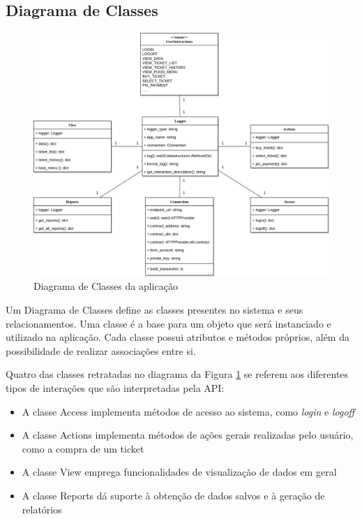 \subsection{Diagrama de Classes}
\begin{figure}
    \centering
    \includegraphics[width=1\textwidth]{img/Cap3/diagramas/Diagrama de Classes.png}
    \caption{Diagrama de Classes da aplicação}
    \label{fig:diagrama_classes}
\end{figure}

Um Diagrama de Classes define as classes presentes no sistema e seus relacionamentos. Uma classe é a base para um objeto que será instanciado e utilizado na aplicação. Cada classe possui atributos e métodos próprios, além da possibilidade de realizar associações entre si.

Quatro das classes retratadas no diagrama da Figura \ref{fig:diagrama_classes} se referem aos diferentes tipos de interações que são interpretadas pela API:
\begin{itemize}
    \item A classe Access implementa métodos de acesso ao sistema, como \emph{login} e \emph{logoff}
    \item A classe Actions implementa métodos de ações gerais realizadas pelo usuário, como a compra de um ticket
    \item A classe View emprega funcionalidades de visualização de dados em geral
    \item A classe Reports dá suporte à obtenção de dados salvos e à geração de relatórios
\end{itemize}

